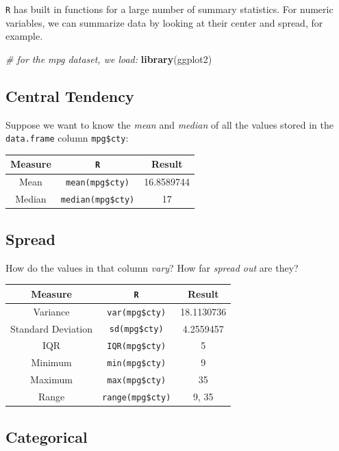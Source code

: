 \documentclass[]{book}
\newenvironment{Shaded}{\begin{snugshade}}{\end{snugshade}}
\newcommand{\KeywordTok}[1]{\textcolor[rgb]{0.13,0.29,0.53}{\textbf{#1}}}
\newcommand{\CommentTok}[1]{\textcolor[rgb]{0.56,0.35,0.01}{\textit{#1}}}
\newcommand{\NormalTok}[1]{#1}
\begin{document}
\texttt{R} has built in functions for a large number of summary
statistics. For numeric variables, we can summarize data by looking at
their center and spread, for example.

\begin{Shaded}
\begin{Highlighting}[]
\CommentTok{# for the mpg dataset, we load:}
\KeywordTok{library}\NormalTok{(ggplot2)}
\end{Highlighting}
\end{Shaded}

\subsection*{Central Tendency}\label{central-tendency}

Suppose we want to know the \emph{mean} and \emph{median} of all the
values stored in the \texttt{data.frame} column \texttt{mpg\$cty}:

\begin{longtable}[]{@{}ccc@{}}
\toprule
Measure & \texttt{R} & Result\tabularnewline
\midrule
\endhead
Mean & \texttt{mean(mpg\$cty)} & 16.8589744\tabularnewline
Median & \texttt{median(mpg\$cty)} & 17\tabularnewline
\bottomrule
\end{longtable}

\subsection*{Spread}\label{spread}

How do the values in that column \emph{vary}? How far \emph{spread out}
are they?

\begin{longtable}[]{@{}ccc@{}}
\toprule
Measure & \texttt{R} & Result\tabularnewline
\midrule
\endhead
Variance & \texttt{var(mpg\$cty)} & 18.1130736\tabularnewline
Standard Deviation & \texttt{sd(mpg\$cty)} & 4.2559457\tabularnewline
IQR & \texttt{IQR(mpg\$cty)} & 5\tabularnewline
Minimum & \texttt{min(mpg\$cty)} & 9\tabularnewline
Maximum & \texttt{max(mpg\$cty)} & 35\tabularnewline
Range & \texttt{range(mpg\$cty)} & 9, 35\tabularnewline
\bottomrule
\end{longtable}

\subsection*{Categorical}\label{categorical}
\end{document}
